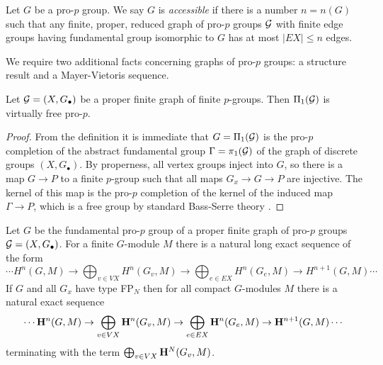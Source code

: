 \documentclass[draft, a4paper]{article}
\begin{document}
\begin{defn}
Let $G$ be a pro-$p$ group. We say $G$ is {\em accessible} if there is a number $n=n(G)$ such that any finite, proper, reduced graph of pro-$p$ groups $\cal G$ with finite edge groups having fundamental group isomorphic to $G$ has at most $|EX|\leq n$ edges.
\end{defn}

We require two additional facts concerning graphs of pro-$p$ groups: a structure result and a Mayer-Vietoris sequence.
\begin{prop}\label{prop:virtfree}
Let ${\cal G}=(X,G_\bullet)$ be a proper finite graph of finite $p$-groups. Then $\Pi_1(\cal G)$ is virtually free pro-$p$.
\end{prop}
\begin{proof}
From the definition it is immediate that $G=\Pi_1(\cal G)$ is the pro-$p$ completion of the abstract fundamental group $\Gamma=\pi_1(\cal G)$ of the graph of discrete groups $(X,G_\bullet)$. By properness, all vertex groups inject into $G$, so there is a map $G\to P$ to a finite $p$-group such that all maps $G_x\to G\to P$ are injective. The kernel of this map is the pro-$p$ completion of the kernel of the induced map $\Gamma \to P$, which is a free group by standard Bass-Serre theory \cite{SerreTrees}.
\end{proof}
\begin{prop}
Let $G$ be the fundamental pro-$p$ group of a proper finite graph of pro-$p$ groups ${\cal G} = (X,G_\bullet)$. For a finite $G$-module $M$ there is a natural long exact sequence of the form
\[\cdots H^n(G,M)\to \bigoplus_{v\in VX}H^n(G_v,M)\to \bigoplus_{e\in EX}H^n(G_e,M)\to H^{n+1}(G,M)\cdots\]
If $G$ and all $G_x$ have type FP${}_N$ then for all compact $G$-modules $M$ there is a natural exact sequence
\[\cdots {\bf H}^n(G,M)\to \bigoplus_{v\in VX}{\bf H}^n(G_v,M)\to \bigoplus_{e\in EX}{\bf H}^n(G_e,M)\to {\bf H}^{n+1}(G,M)\cdots\]
terminating with the term $\bigoplus_{v\in VX} {\bf H}^N(G_v,M)$.\end{prop}
\end{document}
